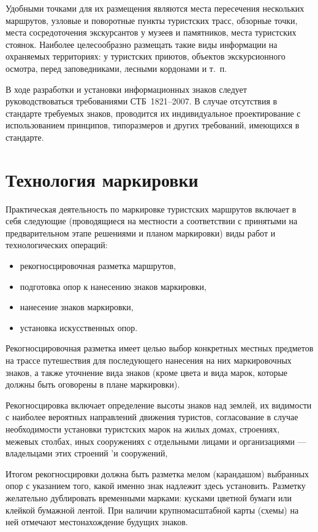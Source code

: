 \documentclass[a4paper,12pt]{extarticle}
\begin{document}
Удобными точками для их размещения являются места пересечения нескольких маршрутов, узловые и поворотные пункты
туристских трасс, обзорные точки, места сосредоточения экскурсантов у музеев и памятников, места туристских стоянок.
Наиболее целесообразно размещать такие виды информации на охраняемых территориях: у туристских приютов, объектов
экскурсионного осмотра, перед заповедниками, лесными кордонами и т.~п.

В ходе разработки и установки информационных знаков следует руководствоваться требованиями СТБ~1821--2007. В случае
отсутствия в стандарте требуемых знаков, проводится их индивидуальное проектирование с использованием принципов,
типоразмеров и других требований, имеющихся в стандарте.

\section{Технология маркировки}

Практическая деятельность по маркировке туристских маршрутов включает в себя следующие (проводящиеся на местности а
соответствии с принятыми на предварительном этапе решениями и планом маркировки) виды работ и технологических операций:

\begin{itemize}
	\item рекогносцировочная разметка маршрутов,
	\item подготовка опор к нанесению знаков маркировки,
	\item нанесение знаков маркировки,
	\item установка искусственных опор.
\end{itemize}

Рекогносцировочная разметка имеет целью выбор конкретных местных предметов на трассе путешествия для последующего
нанесения на них маркировочных знаков, а также уточнение вида знаков (кроме цвета и вида марок, которые должны быть
оговорены в плане маркировки).

Рекогносцировка включает определение высоты знаков над землей, их видимости с наиболее вероятных направлений движения
туристов, согласование в случае необходимости установки туристских марок на жилых домах, строениях, межевых столбах,
иных сооружениях с отдельными лицами и организациями --- владельцами этих строений 'и сооружений,

Итогом рекогносцировки должна быть разметка мелом (карандашом) выбранных опор с указанием того, какой именно знак
надлежит здесь установить. Разметку желательно дублировать временными марками: кусками цветной бумаги или клейкой
бумажной лентой. При наличии крупномасштабной карты (схемы) на ней отмечают местонахождение будущих знаков.
\end{document}
